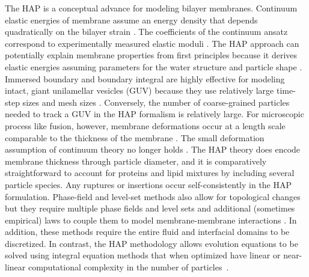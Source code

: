 The HAP is a conceptual advance for modeling bilayer membranes.
Continuum elastic energies of membrane assume an energy density that
depends quadratically on the bilayer strain
\cite{Hamm2000,TerziDeserno17, PhysRevE.102.042406}.  The coefficients
of the continuum ansatz correspond to experimentally measured elastic
moduli \cite{Nagle17, Nagle17-2, NAGLE2000159}.  The HAP approach can
potentially explain membrane properties from first principles because it
derives elastic energies assuming parameters for the water structure and
particle shape \cite{Fu2018_SIAM, FuQuRyYo20, doi:10.1063/5.0009734,
LiAn-Chang16}.  Immersed boundary and boundary integral are highly
effective for modeling intact, giant unilamellar vesicles (GUV) because
they use relatively large time-step sizes and mesh sizes
\cite{
Shravan09,
Rahimian15,
KimLai2010_JCP,
KimLai2012_PRE,
HuLaiSeolEtAl2016_JCP,
Bartels,
Peng13,
RyKlYaCo16,
Sinha15,
Lowengrub13,
Hu,
Hu13}.
Conversely, the number of coarse-grained particles needed to track a GUV
in the HAP formalism is relatively large.  For microscopic process like
fusion, however, membrane deformations occur at a length scale
comparable to the thickness of the membrane
\cite{Kuzmin7235,Aeffner2012,KoKo2002}.  The small deformation
assumption of continuum theory no longer holds
\cite{Hamm2000,TerziDeserno17, PhysRevE.102.042406}.  The HAP theory
does encode membrane thickness through particle diameter, and it is
comparatively straightforward to account for proteins and lipid mixtures
by including several particle species.  Any ruptures or insertions occur
self-consistently in the HAP formulation.  Phase-field and level-set
methods also allow for topological changes but they require multiple
phase fields and level sets and additional (sometimes empirical) laws to
couple them to model membrane-membrane interactions
\cite{
DuLiuWang2004_JCP,
BibenKassnerMisbah2005_PRE,
DoyeuxGuyotChabannesEtAl2013_JCAM,
Du05,
QiangDu08,
doi:10.1098/rspa.2012.0505,
doi:10.1137/130941432,
Feetzl18,
doi:10.1137/16M1108406}.
In addition, these methods require the entire fluid and interfacial
domains to be discretized.  In contrast, the HAP methodology allows
evolution equations to be solved using integral equation methods that
when optimized have linear or near-linear computational complexity in
the number of particles~\cite{fmm1, fmm2, fmm3, fmm4, fmm5, fmm6, fmm7,
fmm8}.



